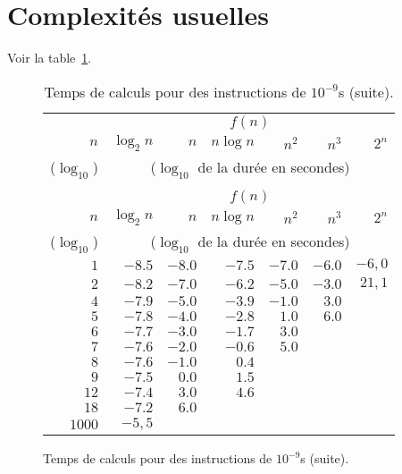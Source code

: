 \section{Complexités usuelles}
Voir la table~\ref{table.complexites.usuelles}.
\begin{figure}[!h]
\begin{center}
\begin{longtable}{rrrrrrr}
\caption{Temps de calculs pour des instructions de $10^{-9}$s.}\label{table.complexites.usuelles}\\
\toprule
   & \multicolumn{6}{c}{$f(n)$} \\ \cmidrule(l){2-7}
   $n$   & $\log_{2} n$ & $n$      & $n\log n$& $n^2$    & $n^3$     &
   $2^n$\\
   ($\log_{10}$) & \multicolumn{6}{c}{($\log_{10}$ de la
     durée en secondes)}\\
   \midrule
\endfirsthead
\caption{Temps de calculs pour des instructions de $10^{-9}$s (suite).}\\
\toprule
   & \multicolumn{6}{c}{$f(n)$} \\ \cmidrule(l){2-7}
   $n$   & $\log_{2} n$ & $n$      & $n\log n$& $n^2$    & $n^3$     &
   $2^n$\\
   ($\log_{10}$) & \multicolumn{6}{c}{($\log_{10}$ de la
     durée en secondes)}\\
   \midrule
\endhead
$1$ & $-8.5$ & $-8.0$ & $-7.5$ & $-7.0$ & $-6.0$ & $-6,0$\\
$2$ & $-8.2$ & $-7.0$ & $-6.2$ & $-5.0$ & $-3.0$ & $21,1$\\
$4$ & $-7.9$ & $-5.0$ & $-3.9$ & $-1.0$ & $3.0$ & \\
$5$ & $-7.8$ & $-4.0$ & $-2.8$ & $1.0$ & $6.0$ & \\
$6$ & $-7.7$ & $-3.0$ & $-1.7$ & $3.0$ & & \\
$7$ & $-7.6$ & $-2.0$ & $-0.6$ & $5.0$ & & \\
$8$ & $-7.6$ & $-1.0$ & $0.4$ & & & \\
$9$ & $-7.5$ & $0.0$ & $1.5$ & & & \\
$12$ & $-7.4$ & $3.0$ & $4.6$ & & & \\
$18$ & $-7.2$ & $6.0$ & & & & \\
$1000$ & $-5,5$ & & & & & \\
 \bottomrule  
\end{longtable}
\end{center}
\end{figure}

